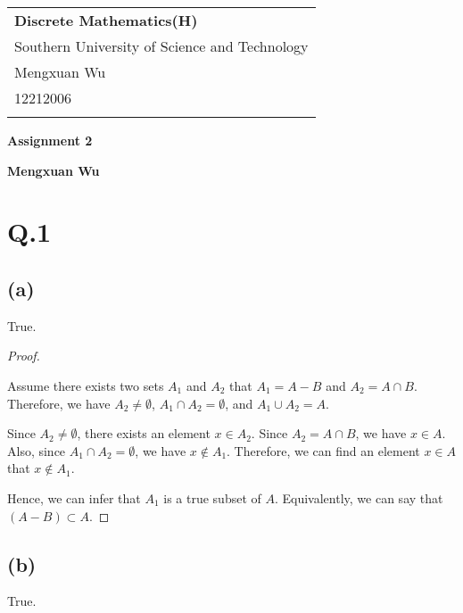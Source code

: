 \documentclass[a4paper,12pt]{article}
\begin{document}
\thispagestyle{empty} %

\begin{tabular}{p{15.5cm}}
{\large \bf Discrete Mathematics(H)} \\
Southern University of Science and Technology \\ Mengxuan Wu \\ 12212006 \\
\hline
\\
\end{tabular}

\vspace*{0.3cm} %

\begin{center}
	{\Large \bf Assignment 2}
	\vspace{2mm}

	{\bf Mengxuan Wu}
		
\end{center}  

\vspace{0.4cm}

\section*{Q.1}

\subsection*{(a)}
True.

\begin{proof}
$ $

Assume there exists two sets $A_1$ and $A_2$ that $A_1 = A - B$ and $A_2 = A \cap B$. 
Therefore, we have $A_2 \ne \emptyset$, $A_1 \cap A_2 = \emptyset$, and $A_1 \cup A_2 = A$.

Since $A_2 \ne \emptyset$, there exists an element $x \in A_2$.
Since $A_2 = A \cap B$, we have $x \in A$.
Also, since $A_1 \cap A_2 = \emptyset$, we have $x \notin A_1$.
Therefore, we can find an element $x \in A$ that $x \notin A_1$.

Hence, we can infer that $A_1$ is a true subset of $A$.
Equivalently, we can say that $(A - B) \subset A$.
\end{proof}

\subsection*{(b)}
True.
\end{document}
